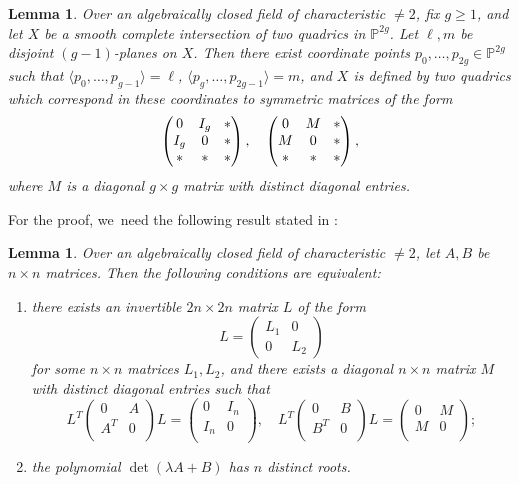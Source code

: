 \documentclass[JEP,XML,SOM,Unicode,NoEqCountersInSection,published]{cedram}
\theoremstyle{plain}
\newtheorem{lem}[thm]{Lemma}
\theoremstyle{definition}
\renewcommand\P{\mathbb{P}}
\begin{document}
\begin{lem}\label{lem:reid-3}
Over an algebraically closed field of characteristic $\neq 2$,
fix $g\geq 1$, and let $X$ be a smooth complete intersection of two quadrics in $\P^{2g}$.
Let $\ell, m$ be disjoint $(g-1)$-planes on $X$.
Then there exist coordinate points $p_0,\dots, p_{2g}\in \P^{2g}$ such that $\langle p_0,\dots, p_{g-1}\rangle =\ell$, $\langle p_{g},\dots, p_{2g-1}\rangle=m$, and $X$ is defined by two quadrics which correspond in these coordinates to symmetric matrices of the form
\[\arraycolsep4.5pt
\begin{pmatrix}
0 & I_g & *\\
I_g & 0 & *\\
* & * & *
\end{pmatrix}, \quad
\begin{pmatrix}
0 & M & *\\
M & 0 & *\\
* & * & *
\end{pmatrix},
\]
where $M$ is a diagonal \(g\times g\) matrix with distinct diagonal entries.
\end{lem}

For the proof, we~need the following result stated in \cite[p.\,44]{Reid-thesis}:

\begin{lem}\label{lem:elementary}
Over an algebraically closed field of characteristic $\neq 2$, let $A, B$ be $n\times n$ matrices.
Then the following conditions are equivalent:
\begin{enumerate}
\item\label{item:change-of-basis} there exists an invertible $2n\times 2n$ matrix $L$ of the form
\[
L = \begin{pmatrix}
L_1 & 0\\
0 & L_2
\end{pmatrix}
\]
for some $n\times n$ matrices $L_1,L_2$,
and there exists a diagonal $n\times n$ matrix $M$ with distinct diagonal entries such that
\[
L^T
\begin{pmatrix}
0 & A \\
A^T & 0 \\
\end{pmatrix}L =
\begin{pmatrix}
0 & I_n \\
I_n & 0 \\
\end{pmatrix}, \quad
L^T
\begin{pmatrix}
0 & B \\
B^T & 0 \\
\end{pmatrix}L =
\begin{pmatrix}
0 & M \\
M & 0 \\
\end{pmatrix};
\]
\item\label{item:polynomial-separable} the polynomial $\det(\lambda A+ B)$ has $n$ distinct roots.
\end{enumerate}
\end{lem}
\end{document}
